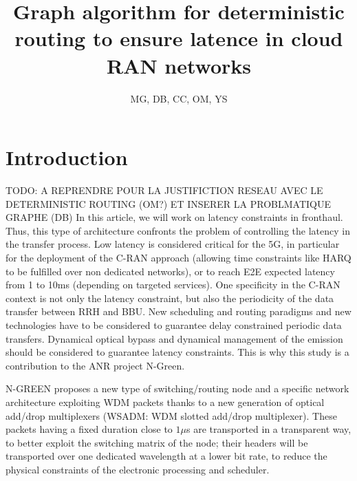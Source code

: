 \documentclass{article}
\begin{document}
\graphicspath{{figures/}}
\newtheorem{rem}{Remarque}
\newtheorem{proposition}{Proposition}
\newtheorem{theorem}{Theorem}
\newtheorem{fact}{Fact}
\newtheorem{lemma}[theorem]{Lemma}
\newtheorem{definition}{Definition}
\newtheorem{corollary}{Corollary}

\title{Graph algorithm for deterministic routing to ensure latence in cloud RAN networks}

\newcommand{\todo}[1]{}
\renewcommand{\todo}[1]{{\color{red} TODO: {#1}}}
 
\author{MG, DB, CC, OM, YS}


\maketitle

 
\section{Introduction}

\todo{A REPRENDRE POUR LA JUSTIFICTION RESEAU AVEC LE DETERMINISTIC ROUTING (OM?) ET INSERER LA PROBLMATIQUE GRAPHE (DB)}
 In this article, we will work on latency constraints in fronthaul.
Thus, this type of architecture confronts the problem of controlling 
the latency in the transfer process.  Low latency is considered critical for the 5G, in particular for the deployment of the C-RAN approach 
(allowing time constraints like HARQ to be fulfilled over non dedicated networks), or to reach E2E expected latency from 1 to 10ms 
(depending on targeted services). One specificity in the C-RAN context is not only the latency constraint, but also the periodicity of 
the data transfer between RRH and BBU.  New scheduling and routing paradigms and new technologies have to be considered to  guarantee 
delay constrained periodic data transfers. Dynamical optical bypass and dynamical management of the emission should be considered to
guarantee latency constraints. This is why this study is a contribution to the ANR project N-Green.

N-GREEN proposes a new type of switching/routing node and a specific network architecture exploiting WDM packets thanks to a new generation of optical add/drop multiplexers (WSADM: WDM slotted add/drop multiplexer). These packets having a fixed duration close to $1\mu $s are transported in a transparent way, to better exploit the switching matrix of the node; their headers will be transported over one dedicated wavelength at a lower bit rate, to reduce the physical constraints of the electronic processing and scheduler.
\end{document}
